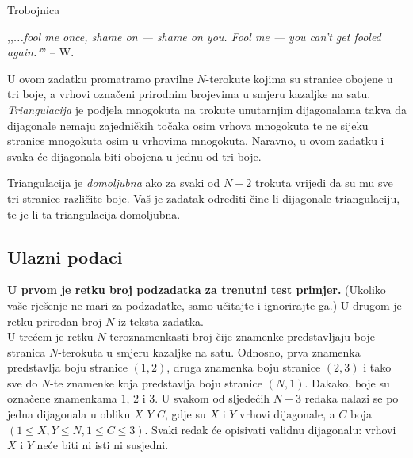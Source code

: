 \begin{statement}[
  problempoints=110,
  timelimit=2 sekunde,
  memorylimit=512 MiB,
]{Trobojnica}


,,\textit{...fool me once, shame on — shame on you. Fool me — you can't get fooled again."}''
-- W.

U ovom zadatku promatramo pravilne $N$-terokute kojima su stranice obojene u tri boje, a vrhovi označeni prirodnim brojevima u smjeru kazaljke na satu.
\textit{Triangulacija} je podjela mnogokuta na trokute unutarnjim
dijagonalama takva da dijagonale nemaju zajedničkih točaka osim vrhova mnogokuta te ne sijeku stranice mnogokuta osim u vrhovima mnogokuta.
Naravno, u ovom zadatku i svaka će dijagonala biti obojena u jednu od tri boje.

Triangulacija je \textit{domoljubna} ako za svaki od $N-2$ trokuta vrijedi da su
mu sve tri stranice različite boje. Vaš je zadatak odrediti čine li dijagonale triangulaciju, te je li ta triangulacija domoljubna.

\subsection*{Ulazni podaci}
\textbf{U prvom je retku broj podzadatka za trenutni test primjer.} (Ukoliko vaše rješenje ne mari za podzadatke, samo učitajte  i ignorirajte ga.)
U drugom je retku prirodan broj $N$ iz teksta zadatka. \\
U trećem je retku $N$-teroznamenkasti broj čije znamenke predstavljaju boje
stranica $N$-terokuta u smjeru kazaljke na satu. Odnosno, prva znamenka
predstavlja boju stranice $(1,2)$, druga znamenka boju stranice $(2,3)$ i tako
sve do $N$-te znamenke koja predstavlja boju stranice $(N, 1)$. Dakako, boje su
označene znamenkama $1$, $2$ i $3$.
U svakom od sljedećih $N-3$ redaka nalazi se po jedna dijagonala u obliku $X$ $Y$ $C$, gdje su $X$ i $Y$ vrhovi dijagonale, a $C$ boja
$(1 \le X, Y \le N, 1 \le C \le 3)$. Svaki redak će opisivati validnu dijagonalu: vrhovi $X$ i $Y$ neće biti ni isti ni susjedni.


\end{statement}
